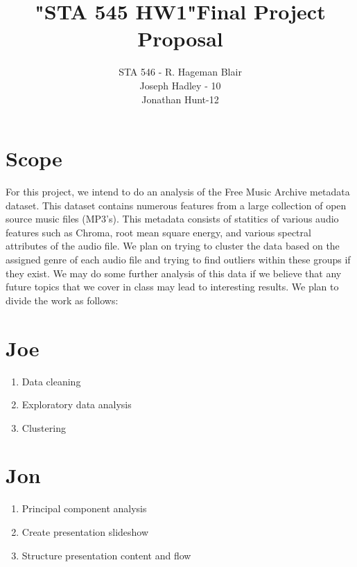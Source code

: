 \documentclass[11pt]{article}
\title{"STA 545 HW1"}
\begin{document}
\title{Final Project Proposal}%
\author{STA 546 - R. Hageman Blair\\
Joseph Hadley - 10\\
Jonathan Hunt-12 %
} %
\maketitle
\section*{Scope}

For this project, we intend to do an analysis of the Free Music Archive metadata
dataset. This dataset contains numerous features from a large collection of open
source music files (MP3's). This metadata consists of statitics of various audio
features such as Chroma, root mean square energy, and various spectral attributes
of the audio file. We plan on trying to cluster the data based on the assigned
genre of each audio file and trying to find outliers within these groups if they
exist. We may do some further analysis of this data if we believe that any future
topics that we cover in class may lead to interesting results. We plan to divide
the work as follows:

\section*{Joe}
\begin{enumerate}
 \item Data cleaning
 \item Exploratory data analysis
 \item Clustering

\end{enumerate}

\section*{Jon}
\begin{enumerate}
 \item Principal component analysis
 \item Create presentation slideshow
 \item Structure presentation content and flow

\end{enumerate}
\end{document}

